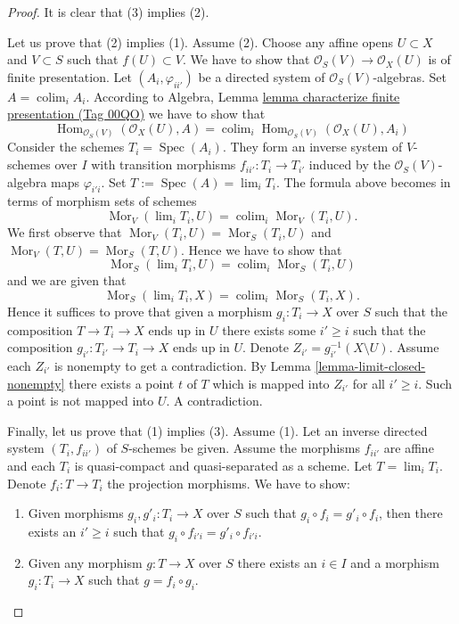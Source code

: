 \documentclass{amsart}
\theoremstyle{plain}
\theoremstyle{definition}
\theoremstyle{remark}
\numberwithin{equation}{subsection}
\def\lim{\mathop{\mathrm{lim}}\nolimits}
\def\colim{\mathop{\mathrm{colim}}\nolimits}
\def\Spec{\mathop{\mathrm{Spec}}}
\def\Hom{\mathop{\mathrm{Hom}}\nolimits}
\def\Mor{\mathop{\mathrm{Mor}}\nolimits}
\begin{document}
\begin{proof}
It is clear that (3) implies (2).

\medskip\noindent
Let us prove that (2) implies (1). Assume (2).
Choose any affine opens $U \subset X$ and $V \subset S$ such that
$f(U) \subset V$. We have to show that
$\mathcal{O}_S(V) \to \mathcal{O}_X(U)$ is of finite presentation.
Let $(A_i, \varphi_{ii'})$ be a directed system of
$\mathcal{O}_S(V)$-algebras. Set $A = \colim_i A_i$.
According to
Algebra, Lemma \href{https://stacks.math.columbia.edu/tag/00QO}{lemma characterize finite presentation (Tag 00QO)}
we have to show that
$$
\Hom_{\mathcal{O}_S(V)}(\mathcal{O}_X(U), A) =
\colim_i \Hom_{\mathcal{O}_S(V)}(\mathcal{O}_X(U), A_i)
$$
Consider the schemes $T_i = \Spec(A_i)$. They
form an inverse system of $V$-schemes over $I$
with transition morphisms $f_{ii'} : T_i \to T_{i'}$
induced by the $\mathcal{O}_S(V)$-algebra maps $\varphi_{i'i}$.
Set $T := \Spec(A) = \lim_i T_i$.
The formula above becomes in terms of morphism sets of schemes
$$
\Mor_V(\lim_i T_i, U) =
\colim_i \Mor_V(T_i, U).
$$
We first observe that
$\Mor_V(T_i, U) = \Mor_S(T_i, U)$
and
$\Mor_V(T, U) = \Mor_S(T, U)$.
Hence we have to show that
$$
\Mor_S(\lim_i T_i, U) =
\colim_i \Mor_S(T_i, U)
$$
and we are given that
$$
\Mor_S(\lim_i T_i, X) =
\colim_i \Mor_S(T_i, X).
$$
Hence it suffices to prove that given a morphism $g_i : T_i \to X$ over $S$
such that the composition $T \to T_i \to X$ ends up in $U$ there exists some
$i' \geq i$ such that the composition $g_{i'} : T_{i'} \to T_i \to X$ ends up
in $U$. Denote $Z_{i'} = g_{i'}^{-1}(X \setminus U)$.
Assume each $Z_{i'}$ is nonempty
to get a contradiction. By Lemma \ref{lemma-limit-closed-nonempty}
there exists a point $t$ of $T$ which is mapped into $Z_{i'}$ for all
$i' \geq i$. Such a point is not mapped into $U$. A contradiction.

\medskip\noindent
Finally, let us prove that (1) implies (3). Assume (1). Let an inverse directed
system $(T_i, f_{ii'})$ of $S$-schemes be given. Assume the morphisms $f_{ii'}$
are affine and each $T_i$ is quasi-compact and quasi-separated as a scheme. Let
$T = \lim_i T_i$. Denote $f_i : T \to T_i$ the projection morphisms.
We have to show:
\begin{enumerate}
\item[(a)] Given morphisms $g_i, g'_i : T_i \to X$ over $S$ such that
$g_i \circ f_i = g'_i \circ f_i$, then there exists an $i' \geq i$
such that $g_i \circ f_{i'i} = g'_i \circ f_{i'i}$.
\item[(b)] Given any morphism
$g : T \to X$ over $S$ there exists an $i \in I$ and a morphism
$g_i : T_i \to X$ such that $g = f_i \circ g_i$.
\end{enumerate}


\end{proof}
\end{document}
